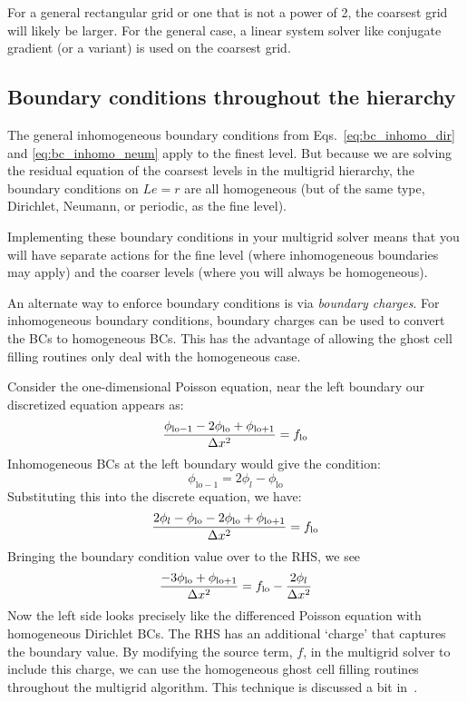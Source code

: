 For a general rectangular grid or one that is not a power of 2, the
coarsest grid will likely be larger.  For the general case, a linear
system solver like conjugate gradient (or a variant) is used on the
coarsest grid.

\subsection{Boundary conditions throughout the hierarchy}

The general inhomogeneous boundary conditions from
Eqs.~\ref{eq:bc_inhomo_dir} and \ref{eq:bc_inhomo_neum} apply to the
finest level.  But because we are solving the residual equation of the
coarsest levels in the multigrid hierarchy, the boundary conditions on
$Le = r$ are all homogeneous (but of the same type, Dirichlet,
Neumann, or periodic, as the fine level).

Implementing these boundary conditions in your multigrid solver means
that you will have separate actions for the fine level (where
inhomogeneous boundaries may apply) and the coarser levels (where you
will always be homogeneous).

An alternate way to enforce boundary conditions is via {\em boundary
  charges}.  For inhomogeneous boundary conditions, boundary charges
can be used to convert the BCs to homogeneous BCs.  This has the
advantage of allowing the ghost cell filling routines only deal with
the homogeneous case.

Consider the one-dimensional Poisson equation, near the left boundary
our discretized equation appears as:
\begin{equation}
\frac{\phi_\mathrm{lo-1} - 2\phi_\mathrm{lo} + \phi_\mathrm{lo+1}}{\Delta x^2}
 = f_\mathrm{lo}
\end{equation}
Inhomogeneous BCs at the left boundary would give the condition:
\begin{equation}
\phi_\mathrm{lo-1} = 2 \phi_l - \phi_\mathrm{lo}
\end{equation}
Substituting this into the discrete equation, we have:
\begin{equation}
\frac{2 \phi_l - \phi_\mathrm{lo} - 2\phi_\mathrm{lo} + \phi_\mathrm{lo+1}}{\Delta x^2}
 = f_\mathrm{lo}
\end{equation}
Bringing the boundary condition value over to the RHS, we see
\begin{equation}
\frac{- 3\phi_\mathrm{lo} + \phi_\mathrm{lo+1}}{\Delta x^2}
 = f_\mathrm{lo} - \frac{2\phi_l}{\Delta x^2}
\end{equation}
Now the left side looks precisely like the differenced Poisson equation
with homogeneous Dirichlet BCs.  The RHS has an additional `charge' that
captures the boundary value.  By modifying the source term, $f$, in the
multigrid solver to include this charge, we can use the homogeneous 
ghost cell filling routines throughout the multigrid algorithm.
This technique is discussed a bit in~\cite{colellanotes}.

